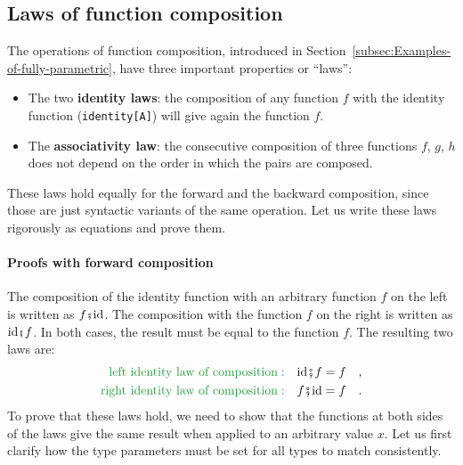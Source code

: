 \subsection{Laws of function composition\label{subsec:Laws-of-function-composition}}

The operations of function composition, introduced in Section~\ref{subsec:Examples-of-fully-parametric},
have three important properties or \textsf{``}laws\textsf{''}:
\begin{itemize}
\item The two \textbf{identity laws}:
the composition of any function $f$ with the identity function (\lstinline!identity[A]!)
will give again the function $f$.
\item The \textbf{associativity law}:
the consecutive composition of three functions $f$, $g$, $h$ does
not depend on the order in which the pairs are composed.
\end{itemize}
These laws hold equally for the forward and the backward composition,
since those are just syntactic variants of the same operation. Let
us write these laws rigorously as equations and prove them.

\paragraph{Proofs with forward composition}

The composition of the identity function with an arbitrary function
$f$ on the left is written as $f\bef\text{id}$. The composition
with the function $f$ on the right is written as $\text{id}\bef f$.
In both cases, the result must be equal to the function $f$. The
resulting two laws are:
\begin{align*}
{\color{greenunder}\text{left identity law of composition}:}\quad & \text{id}\bef f=f\quad,\\
{\color{greenunder}\text{right identity law of composition}:}\quad & f\bef\text{id}=f\quad.
\end{align*}
To prove that these laws hold, we need to show that the functions
at both sides of the laws  give the same result when applied to an
arbitrary value $x$. Let us first clarify how the type parameters
must be set for all types to match consistently.

